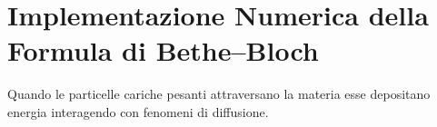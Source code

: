 \chapter{Implementazione Numerica della Formula di Bethe--Bloch}
Quando le particelle cariche pesanti attraversano la materia esse depositano energia interagendo con fenomeni di diffusione.
